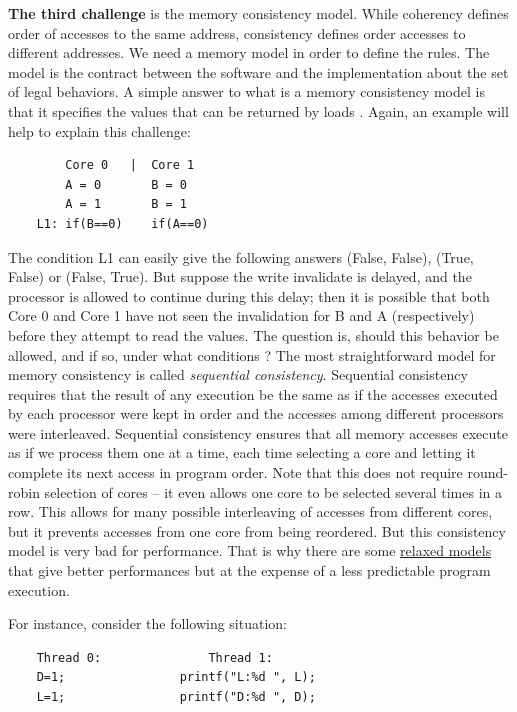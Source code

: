 \documentclass[10pt,letterpaper]{article}
\begin{document}
\textbf{The third challenge} is the memory consistency model. While coherency defines order of accesses to the same address, consistency defines order accesses to different addresses. We need a memory model in order to define the rules. The model is the contract between the software and the implementation about the set of legal behaviors. A simple answer to what is a memory consistency model is that it specifies the values that can be returned by loads \cite{url2}. Again, an example will help to explain this challenge:

\begin{verbatim}
        Core 0   |  Core 1
        A = 0       B = 0
        A = 1       B = 1
    L1: if(B==0)    if(A==0)
\end{verbatim}

The condition L1 can easily give the following answers (False, False), (True, False) or (False, True). But suppose the write invalidate is delayed, and the processor is allowed to continue during this delay; then it is possible that both Core 0 and Core 1 have not seen the invalidation for B and A (respectively) before they attempt to read the values. The question is, should this behavior be allowed, and if so, under what conditions ? The most straightforward model for memory consistency is called \textit{sequential consistency}. Sequential consistency requires that the result of any execution be the same as if the accesses executed by each processor were kept in order and the accesses among different processors were interleaved. Sequential consistency ensures that all memory accesses execute as if we process them one at a time, each time selecting a core and letting it complete its next access in program order. Note that this does not require round-robin selection of cores – it even allows one core to be selected several times in a row. This allows for many possible interleaving of accesses from different cores, but it prevents accesses from one core from being reordered. But this consistency model is very bad for performance. That is why there are some \underline{relaxed models} that give better performances but at the expense of a less predictable program execution.

For instance, consider the following situation:

\begin{verbatim}
    Thread 0:               Thread 1:
    D=1;                printf("L:%d ", L);
    L=1;                printf("D:%d ", D);
\end{verbatim}
\end{document}
